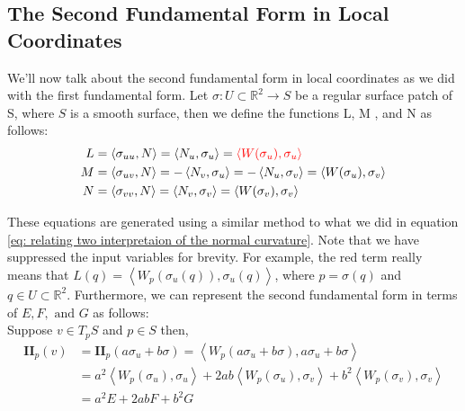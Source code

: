 \documentclass{article}
\theoremstyle{plain}
\theoremstyle{definition}
\theoremstyle{remark}
\newcommand{\R}{\mathbb{R}}
\begin{document}
\subsection{The Second Fundamental Form in Local Coordinates}
We'll now talk about the second fundamental form in local coordinates as we did with the first fundamental form. Let \( \sigma: U \subset \R^2 \rightarrow S\) be a regular surface patch of S, where \(S\) is a smooth surface, then we define the functions L, M , and N as follows:
\begin{align} \label{eq: define second fundamental form in local coordinates}
    \begin{split}
        L & = \left\langle \sigma_{uu}, N\right\rangle = \left\langle N_u, \sigma_u\right\rangle = { \color{red}\left\langle W(\sigma_u), \sigma_u\right\rangle} \\
        M & = \left\langle \sigma_{uv}, N\right\rangle = - \left\langle N_v, \sigma_u\right\rangle = - \left\langle N_u, \sigma_v\right\rangle  = \left\langle W(\sigma_u), \sigma_v\right\rangle \\
        N & = \left\langle \sigma_{vv}, N\right\rangle = \left\langle N_v, \sigma_v\right\rangle = \left\langle W(\sigma_v), \sigma_v\right\rangle
    \end{split}
\end{align}

These equations are generated using a similar method to what we did in equation \ref{eq: relating two interpretaion of the normal curvature}. Note that we have suppressed the input variables for brevity. For example, the red term really means that \( L(q) = \left\langle W_{p}(\sigma_u(q)), \sigma_u(q)\right\rangle \), where \(p = \sigma(q)\) and \(q \in U \subset \R^2\). Furthermore, we can represent the second fundamental form in terms of \(E, F, \text{ and } G\) as follows:\\
Suppose \( v \in T_pS\) and \( p \in S\) then,
\begin{align*}
    \mathbf{II}_p(v) & = \mathbf{II}_p(a\sigma_u + b\sigma) = \left\langle W_p(a\sigma_u + b\sigma), a\sigma_u + b\sigma \right\rangle                                                        \\
                     & = a^2 \left\langle W_p(\sigma_u), \sigma_u\right\rangle + 2ab\left\langle W_p(\sigma_u), \sigma_v\right\rangle + b^2\left\langle W_p(\sigma_v), \sigma_v \right\rangle \\
                     & = a^2 E + 2ab F + b^2 G
\end{align*}
\end{document}
